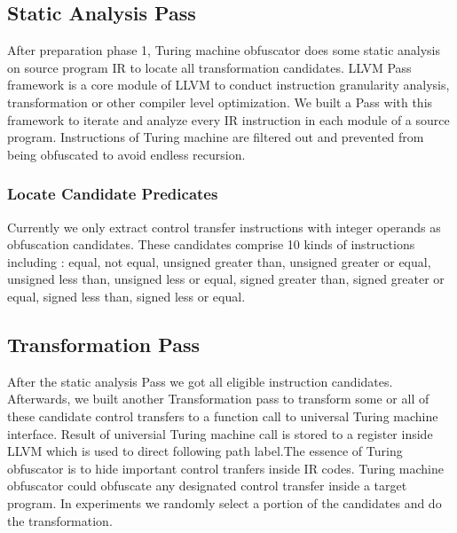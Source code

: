 \documentclass[lnicst]{svmultln}
\begin{document}
\subsection{Static Analysis Pass}
After preparation phase 1, Turing machine obfuscator does some static analysis on source program IR to locate all transformation candidates. LLVM Pass framework is a core module of LLVM to conduct instruction granularity analysis, transformation or other compiler level optimization.
We built a Pass with this framework to iterate and analyze every IR instruction in each module of a source program. Instructions of Turing machine are filtered out and prevented from being obfuscated to avoid endless recursion. 
\subsubsection{Locate Candidate Predicates}
Currently we only extract control transfer instructions with integer operands as obfuscation candidates. These candidates comprise 10 kinds of instructions including : equal, not equal, unsigned greater than, unsigned greater or equal,  unsigned less than, unsigned less or equal, signed greater than, signed greater or equal, signed less than, signed less or equal. 
\subsection{Transformation Pass}
After the static analysis Pass we got all eligible instruction candidates. Afterwards, we built another Transformation pass to transform some or all of these candidate control transfers to a function call to universal Turing machine interface. Result of universial Turing machine call is stored to a register inside LLVM which is used to direct following path label.The essence of Turing obfuscator is to hide important control tranfers inside IR codes. Turing machine obfuscator could obfuscate any designated control transfer inside a target program. In experiments we randomly select a portion of the candidates and do the transformation.
\end{document}
